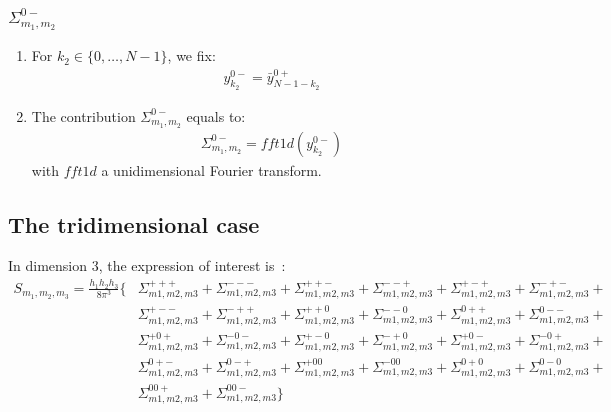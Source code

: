 \subsubsection{$\Sigma_{m_1,m_2}^{0-}$}
\begin{enumerate}
\item For $k_2\in\{0,\hdots,N-1\}$, we fix:
\begin{align*}
y^{0-}_{k_2}= \bar{y}^{0+}_{N-1-k_2}
\end{align*}
\item The contribution $\Sigma_{m_1,m_2}^{0-}$ equals to:
\begin{align*}
  \Sigma_{m_1,m_2}^{0-}=fft1d(y^{0-}_{k_2})
\end{align*}
with $fft1d$ a unidimensional Fourier transform.
\end{enumerate}

\subsection{The tridimensional case}
In dimension 3, the expression of interest is~:
\begin{align*}
S_{m_1,m_2,m_3}=\frac{h_1h_2h_3}{8\pi^3}\Big\{
 &   \Sigma_{m1,m2,m3}^{+++} + \Sigma_{m1,m2,m3}^{---} +
     \Sigma_{m1,m2,m3}^{++-} + \Sigma_{m1,m2,m3}^{--+} +
     \Sigma_{m1,m2,m3}^{+-+} + \Sigma_{m1,m2,m3}^{-+-} + \\
 &   \Sigma_{m1,m2,m3}^{+--} + \Sigma_{m1,m2,m3}^{-++} +
     \Sigma_{m1,m2,m3}^{++0} + \Sigma_{m1,m2,m3}^{--0} +
     \Sigma_{m1,m2,m3}^{0++} + \Sigma_{m1,m2,m3}^{0--} + \\
 &   \Sigma_{m1,m2,m3}^{+0+} + \Sigma_{m1,m2,m3}^{-0-} +
     \Sigma_{m1,m2,m3}^{+-0} + \Sigma_{m1,m2,m3}^{-+0} +
     \Sigma_{m1,m2,m3}^{+0-} + \Sigma_{m1,m2,m3}^{-0+} + \\
 &   \Sigma_{m1,m2,m3}^{0+-} + \Sigma_{m1,m2,m3}^{0-+} +
     \Sigma_{m1,m2,m3}^{+00} + \Sigma_{m1,m2,m3}^{-00} +
     \Sigma_{m1,m2,m3}^{0+0} + \Sigma_{m1,m2,m3}^{0-0} + \\
 &   \Sigma_{m1,m2,m3}^{00+} + \Sigma_{m1,m2,m3}^{00-}
\Big\}
\end{align*}

